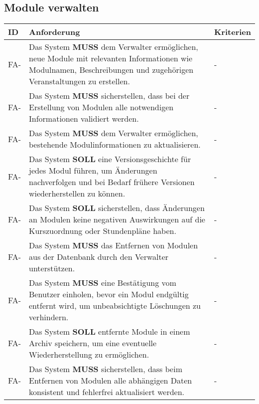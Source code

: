 \subsection{Module verwalten}
\begin{tabular} {|p{}|p{11cm}|p{}|}
	\hline
	ID & Anforderung & Kriterien \\
	\hline
	FA-
	& Das System \textbf{MUSS} dem Verwalter ermöglichen, neue Module mit relevanten Informationen wie Modulnamen, Beschreibungen und zugehörigen Veranstaltungen zu erstellen. 
	& - \\
	\hline
	FA-
	& Das System \textbf{MUSS} sicherstellen, dass bei der Erstellung von Modulen alle notwendigen Informationen validiert werden. 
	& - \\
	\hline
	FA-
	& Das System \textbf{MUSS} dem Verwalter ermöglichen, bestehende Modulinformationen zu aktualisieren. 
	& - \\
	\hline
	FA-
	& Das System \textbf{SOLL} eine Versionsgeschichte für jedes Modul führen, um Änderungen nachverfolgen und bei Bedarf frühere Versionen wiederherstellen zu können. 
	& - \\
	\hline
	FA-
	& Das System \textbf{SOLL} sicherstellen, dass Änderungen an Modulen keine negativen Auswirkungen auf die Kurszuordnung oder Stundenpläne haben. 
	& - \\
	\hline
	FA-
	& Das System \textbf{MUSS} das Entfernen von Modulen aus der Datenbank durch den Verwalter unterstützen. 
	& - \\
	\hline
	FA-
	& Das System \textbf{MUSS} eine Bestätigung vom Benutzer einholen, bevor ein Modul endgültig entfernt wird, um unbeabsichtigte Löschungen zu verhindern. 
	& - \\
	\hline
	FA-
	& Das System \textbf{SOLL} entfernte Module in einem Archiv speichern, um eine eventuelle Wiederherstellung zu ermöglichen. 
	& - \\
	\hline
	FA-
	& Das System \textbf{MUSS} sicherstellen, dass beim Entfernen von Modulen alle abhängigen Daten konsistent und fehlerfrei aktualisiert werden. 
	& - \\
	\hline
\end{tabular}

\newpage

